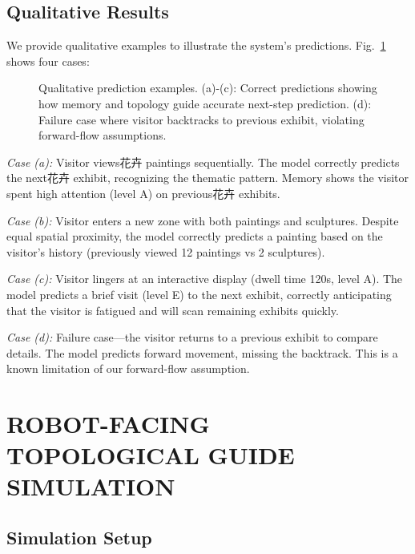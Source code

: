 \documentclass[letterpaper]{article}
\begin{document}
\subsection{Qualitative Results}

We provide qualitative examples to illustrate the system's predictions. Fig.~\ref{fig:qualitative} shows four cases:

\begin{figure}[h]
\centering
\caption{Qualitative prediction examples. (a)-(c): Correct predictions showing how memory and topology guide accurate next-step prediction. (d): Failure case where visitor backtracks to previous exhibit, violating forward-flow assumptions.}
\label{fig:qualitative}
\end{figure}

\textit{Case (a):} Visitor views花卉 paintings sequentially. The model correctly predicts the next花卉 exhibit, recognizing the thematic pattern. Memory shows the visitor spent high attention (level A) on previous花卉 exhibits.

\textit{Case (b):} Visitor enters a new zone with both paintings and sculptures. Despite equal spatial proximity, the model correctly predicts a painting based on the visitor's history (previously viewed 12 paintings vs 2 sculptures).

\textit{Case (c):} Visitor lingers at an interactive display (dwell time 120s, level A). The model predicts a brief visit (level E) to the next exhibit, correctly anticipating that the visitor is fatigued and will scan remaining exhibits quickly.

\textit{Case (d):} Failure case—the visitor returns to a previous exhibit to compare details. The model predicts forward movement, missing the backtrack. This is a known limitation of our forward-flow assumption.

\section{ROBOT-FACING TOPOLOGICAL GUIDE SIMULATION}

\subsection{Simulation Setup}
\end{document}

